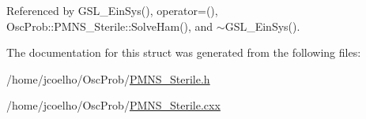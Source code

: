 Referenced by G\+S\+L\+\_\+\+Ein\+Sys(), operator=(), Osc\+Prob\+::\+P\+M\+N\+S\+\_\+\+Sterile\+::\+Solve\+Ham(), and $\sim$\+G\+S\+L\+\_\+\+Ein\+Sys().



The documentation for this struct was generated from the following files\+:\begin{DoxyCompactItemize}
\item 
/home/jcoelho/\+Osc\+Prob/\hyperlink{PMNS__Sterile_8h}{P\+M\+N\+S\+\_\+\+Sterile.\+h}\item 
/home/jcoelho/\+Osc\+Prob/\hyperlink{PMNS__Sterile_8cxx}{P\+M\+N\+S\+\_\+\+Sterile.\+cxx}\end{DoxyCompactItemize}
